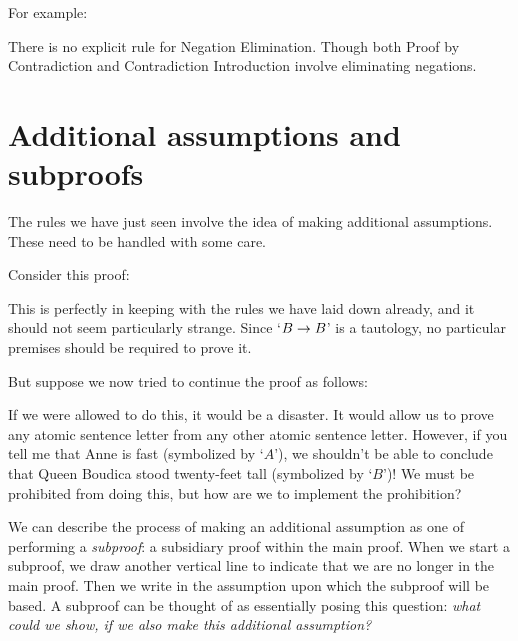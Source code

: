 For example:
	\begin{pf}
		\open
		\close
	\end{pf}

There is no explicit rule for Negation Elimination. Though both Proof by Contradiction and Contradiction Introduction involve eliminating negations. 


\section{Additional assumptions and subproofs}
The rules we have just seen involve the idea of making additional assumptions. These need to be handled with some care. 

Consider this proof:
\begin{pf}
	\hypo{a}{A}
	\open
		\hypo{b1}{B}
		 \Reiteration{b1}
	\close
	\ci{b1-b2}
\end{pf}
This is perfectly in keeping with the rules we have laid down already, and it should not seem particularly strange. Since `$B \rightarrow B$' is a tautology, no particular premises should be required to prove it. 

But suppose we now tried to continue the proof as follows:
\begin{pf}
	\open
		 
	\close
\end{pf}
If we were allowed to do this, it would be a disaster. It would allow us to prove any atomic sentence letter from any other atomic sentence letter. However, if you tell me that Anne is fast (symbolized by `$A$'), we shouldn't be able to conclude that Queen Boudica stood twenty-feet tall (symbolized by `$B$')! We must be prohibited from doing this, but how are we to implement the prohibition?

We can describe the process of making an additional assumption as one of performing a \emph{subproof}: a subsidiary proof within the main proof. When we start a subproof, we draw another vertical line to indicate that we are no longer in the main proof. Then we write in the assumption upon which the subproof will be based. A subproof can be thought of as essentially posing this question: \emph{what could we show, if we also make this additional assumption?}

